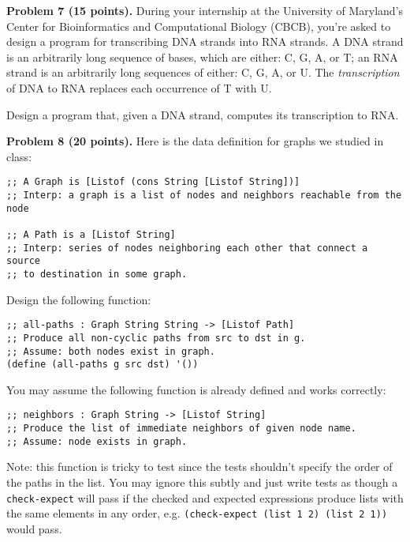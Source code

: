 \documentclass[12pt]{article}
\begin{document}
\newpage



\newpage
\noindent
{\bf Problem 7 (15 points).}  
%
During your internship at the University of Maryland's Center for
Bioinformatics and Computational Biology (CBCB), you're asked to
design a program for transcribing DNA strands into RNA strands.
%
A DNA strand is an arbitrarily long sequence of bases, which are
either: C, G, A, or T; an RNA strand is an arbitrarily long sequences
of either: C, G, A, or U.  The \emph{transcription} of DNA to RNA
replaces each occurrence of T with U.

Design a program that, given a DNA strand, computes its transcription
to RNA.

\newpage


\noindent
{\bf Problem 8 (20 points).} Here is the data definition for graphs we studied in class:
\begin{verbatim}
;; A Graph is [Listof (cons String [Listof String])]
;; Interp: a graph is a list of nodes and neighbors reachable from the node

;; A Path is a [Listof String]
;; Interp: series of nodes neighboring each other that connect a source
;; to destination in some graph.
\end{verbatim}

\noindent
Design the following function:

\begin{verbatim}
;; all-paths : Graph String String -> [Listof Path]
;; Produce all non-cyclic paths from src to dst in g.
;; Assume: both nodes exist in graph.
(define (all-paths g src dst) '())
\end{verbatim}

\noindent
You may assume the following function is already defined and works correctly:

\begin{verbatim}
;; neighbors : Graph String -> [Listof String]
;; Produce the list of immediate neighbors of given node name.
;; Assume: node exists in graph.
\end{verbatim}

\noindent
Note: this function is tricky to test since the tests shouldn't
specify the order of the paths in the list.  You may ignore this
subtly and just write tests as though a {\tt check-expect} will pass
if the checked and expected expressions produce lists with the same
elements in any order, e.g. {\tt (check-expect (list 1 2) (list 2 1))}
would pass.

\end{document}
